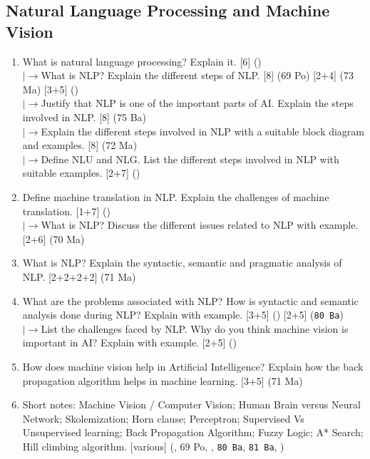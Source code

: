 \documentclass[12pt]{article}
\newcommand{\lb}{\\$\left|\rightarrow\right.$}
\begin{document}
  \subsection{Natural Language Processing and Machine Vision}
    \begin{enumerate}[topsep=0pt, noitemsep]
      \item What is natural language processing? Explain it. \hfill [6] ()
        \lb What is NLP? Explain the different steps of NLP. \hfill [8] (69 Po) [2+4] (73 Ma) [3+5] ()
        \lb Justify that NLP is one of the important parts of AI. Explain the steps involved in NLP. \hfill [8] (75 Ba)
        \lb Explain the different steps involved in NLP with a suitable block diagram and examples. \hfill [8] (72 Ma)
        \lb Define NLU and NLG. List the different steps involved in NLP with suitable examples. \hfill [2+7] ()

      \item Define machine translation in NLP. Explain the challenges of machine translation. \hfill [1+7] ()
        \lb What is NLP? Discuss the different issues related to NLP with example. \hfill [2+6] (70 Ma)

      \item What is NLP? Explain the syntactic, semantic and pragmatic analysis of NLP. \hfill [2+2+2+2] (71 Ma)

      \item What are the problems associated with NLP? How is syntactic and semantic analysis done during NLP? Explain with example. \hfill [3+5] () [2+5] (\texttt{80 Ba})
        \lb List the challenges faced by NLP. Why do you think machine vision is important in AI? Explain with example. \hfill [2+5] ()

      \item How does machine vision help in Artificial Intelligence? Explain how the back propagation algorithm helps in machine learning. \hfill [3+5] (71 Ma)

      \item Short notes: Machine Vision / Computer Vision; Human Brain versus Neural Network; Skolemization; Horn clause; Perceptron; Supervised Vs Unsupervised learning; Back Propagation Algorithm; Fuzzy Logic; A* Search; Hill climbing algorithm. \hfill [various] (, 69 Po, , \texttt{80 Ba}, \texttt{81 Ba}, )
    \end{enumerate}
\end{document}
